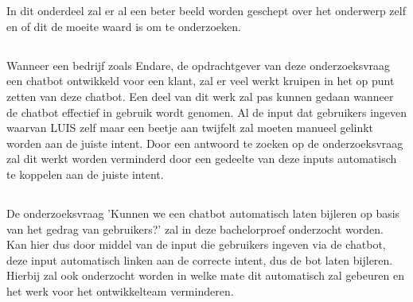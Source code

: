 
\chapter{}
\label{ch:inleiding}

In dit onderdeel zal er al een beter beeld worden geschept over het onderwerp zelf en of dit de moeite waard is om te onderzoeken.

\section{}
\label{sec:probleemstelling}

Wanneer een bedrijf zoals Endare, de opdrachtgever van deze onderzoeksvraag een chatbot ontwikkeld voor een klant, zal er veel werkt kruipen in het op punt zetten van deze chatbot. Een deel van dit werk zal pas kunnen gedaan wanneer de chatbot effectief in gebruik wordt genomen. Al de input dat gebruikers ingeven waarvan LUIS zelf maar een beetje aan twijfelt zal moeten manueel gelinkt worden aan de juiste intent. Door een antwoord te zoeken op de onderzoeksvraag zal dit werkt worden verminderd door een gedeelte van deze inputs automatisch te koppelen aan de juiste intent.

\section{}
\label{sec:onderzoeksvraag}

De onderzoeksvraag 'Kunnen we een chatbot automatisch laten bijleren op basis van het gedrag van gebruikers?' zal in deze bachelorproef onderzocht worden. Kan hier dus door middel van de input die gebruikers ingeven via de chatbot, deze input automatisch linken aan de correcte intent, dus de bot laten bijleren. Hierbij zal ook onderzocht worden in welke mate dit automatisch zal gebeuren en het werk voor het ontwikkelteam verminderen.

\section{}
\label{sec:onderzoeksdoelstelling}

